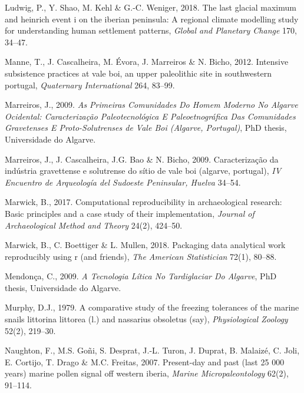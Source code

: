 \documentclass[12pt,twoside]{reedthesis}
\begin{document}
\leavevmode\hypertarget{ref-ludwig2018}{}%
Ludwig, P., Y. Shao, M. Kehl \& G.-C. Weniger, 2018. The last glacial maximum and heinrich event i on the iberian peninsula: A regional climate modelling study for understanding human settlement patterns, \emph{Global and Planetary Change} 170, 34--47.

\leavevmode\hypertarget{ref-manne2012}{}%
Manne, T., J. Cascalheira, M. Évora, J. Marreiros \& N. Bicho, 2012. Intensive subsistence practices at vale boi, an upper paleolithic site in southwestern portugal, \emph{Quaternary International} 264, 83--99.

\leavevmode\hypertarget{ref-marreiros2009}{}%
Marreiros, J., 2009. \emph{\textup{As Primeiras Comunidades Do Homem Moderno No Algarve Ocidental: Caracterização Paleotecnológica E Paleoetnográfica Das Comunidades Gravetenses E Proto-Solutrenses de Vale Boi (Algarve, Portugal)}}, PhD thesis, Universidade do Algarve.

\leavevmode\hypertarget{ref-marreirosetal2009}{}%
Marreiros, J., J. Cascalheira, J.G. Bao \& N. Bicho, 2009. Caracterização da indústria gravettense e solutrense do sítio de vale boi (algarve, portugal), \emph{IV Encuentro de Arqueología del Sudoeste Peninsular, Huelva} 34--54.

\leavevmode\hypertarget{ref-marwick2017}{}%
Marwick, B., 2017. Computational reproducibility in archaeological research: Basic principles and a case study of their implementation, \emph{Journal of Archaeological Method and Theory} 24(2), 424--50.

\leavevmode\hypertarget{ref-marwick2018}{}%
Marwick, B., C. Boettiger \& L. Mullen, 2018. Packaging data analytical work reproducibly using r (and friends), \emph{The American Statistician} 72(1), 80--88.

\leavevmode\hypertarget{ref-mendonca2009}{}%
Mendonça, C., 2009. \emph{\textup{A Tecnologia Lítica No Tardiglaciar Do Algarve}}, PhD thesis, Universidade do Algarve.

\leavevmode\hypertarget{ref-murphy1979}{}%
Murphy, D.J., 1979. A comparative study of the freezing tolerances of the marine snails littorina littorea (l.) and nassarius obsoletus (say), \emph{Physiological Zoology} 52(2), 219--30.

\leavevmode\hypertarget{ref-naughton2007}{}%
Naughton, F., M.S. Goñi, S. Desprat, J.-L. Turon, J. Duprat, B. Malaizé, C. Joli, E. Cortijo, T. Drago \& M.C. Freitas, 2007. Present-day and past (last 25 000 years) marine pollen signal off western iberia, \emph{Marine Micropaleontology} 62(2), 91--114.
\end{document}
